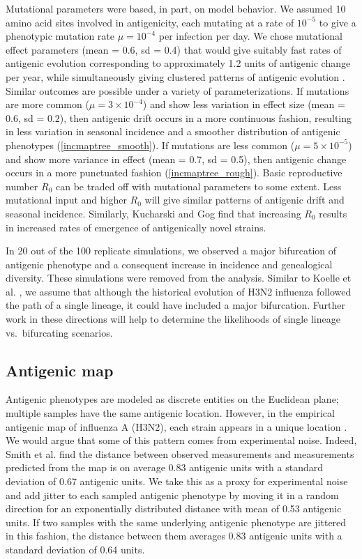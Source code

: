 Mutational parameters were based, in part, on model behavior.  We assumed 10 amino acid sites involved in antigenicity, each mutating at a rate of $10^{-5}$ \cite{Rambaut08} to give a phenotypic mutation rate $\mu = 10^{-4}$ per infection per day.  We chose mutational effect parameters (mean = 0.6, sd = 0.4) that would give suitably fast rates of antigenic evolution corresponding to approximately 1.2 units of antigenic change per year, while simultaneously giving clustered patterns of antigenic evolution  \cite{Smith04}.  Similar outcomes are possible under a variety of parameterizations.  If mutations are more common ($\mu = 3 \times 10^{-4}$) and show less variation in effect size (mean = 0.6, sd = 0.2), then antigenic drift occurs in a more continuous fashion, resulting in less variation in seasonal incidence and a smoother distribution of antigenic phenotypes (\ref{incmaptree_smooth}).  If mutations are less common ($\mu = 5 \times 10^{-5}$) and show more variance in effect (mean = 0.7, sd = 0.5), then antigenic change occurs in a more punctuated fashion (\ref{incmaptree_rough}).  Basic reproductive number $R_0$ can be traded off with mutational parameters to some extent.  Less mutational input and higher $R_0$ will give similar patterns of antigenic drift and seasonal incidence.  Similarly, Kucharski and Gog \cite{Kucharski11} find that increasing $R_0$ results in increased rates of emergence of antigenically novel strains.

In 20 out of the 100 replicate simulations, we observed a major bifurcation of antigenic phenotype and a consequent increase in incidence and genealogical diversity.  These simulations were removed from the analysis.   Similar to Koelle et al. \cite{Koelle11}, we assume that although the historical evolution of H3N2 influenza followed the path of a single lineage, it could have included a major bifurcation.  Further work in these directions will help to determine the likelihoods of single lineage vs.\ bifurcating scenarios.

\subsection*{Antigenic map}

Antigenic phenotypes are modeled as discrete entities on the Euclidean plane; multiple samples have the same antigenic location.  However, in the empirical antigenic map of influenza A (H3N2), each strain appears in a unique location \cite{Smith04}.  We would argue that some of this pattern comes from experimental noise.  Indeed, Smith et al. \cite{Smith04} find the distance between observed measurements and measurements predicted from the map is on average 0.83 antigenic units with a standard deviation of 0.67 antigenic units.  We take this as a proxy for experimental noise and add jitter to each sampled antigenic phenotype by moving it in a random direction for an exponentially distributed distance with mean of 0.53 antigenic units.  If two samples with the same underlying antigenic phenotype are jittered in this fashion, the distance between them averages 0.83 antigenic units with a standard deviation of 0.64 units.

